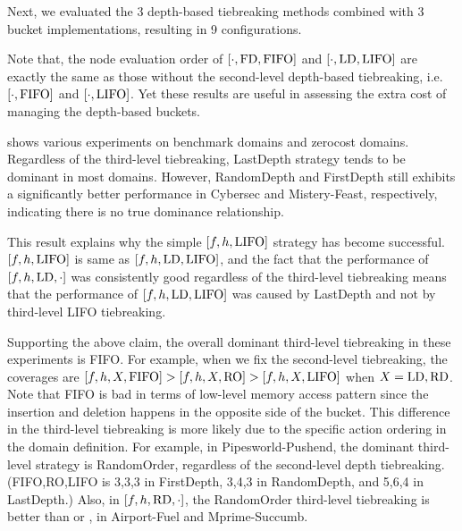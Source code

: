 Next, we evaluated the 3 depth-based tiebreaking methods combined with 3
bucket implementations, resulting in 9 configurations.

Note that, the node evaluation order of $[\cdot,\mbox{FD},\mbox{FIFO}]$ and $[\cdot,\mbox{LD},\mbox{LIFO}]$
are exactly the same as those without the second-level
depth-based tiebreaking, i.e.\ $[\cdot,\mbox{FIFO}]$ and $[\cdot,\mbox{LIFO}]$.
Yet these results are useful in assessing the extra cost of managing the
depth-based buckets.

 shows various experiments on benchmark domains and
zerocost domains. Regardless of the third-level tiebreaking, LastDepth
strategy tends to be dominant in most domains. However, RandomDepth and
FirstDepth still exhibits a significantly better performance in Cybersec
and Mistery-Feast, respectively, indicating there is no true dominance relationship.

This result explains why the simple $[f,h,\mbox{LIFO}]$ strategy has become
successful. $[f,h,\mbox{LIFO}]$ is same as $[f,h,\mbox{LD},\mbox{LIFO}]$, and the fact
that the performance of $[f,h,\mbox{LD},\cdot]$ was consistently good
regardless of the third-level tiebreaking means that the performance of
$[f,h,\mbox{LD},\mbox{LIFO}]$ was caused by LastDepth and not by third-level LIFO tiebreaking.

Supporting the above claim, the overall dominant third-level tiebreaking
in these experiments is FIFO.  For example, when we fix the second-level
tiebreaking, the coverages are $[f,h,X,\mbox{FIFO}]>[f,h,X,\mbox{RO}]>[f,h,X,\mbox{LIFO}]$
when $X=\mbox{LD},\mbox{RD}$.  Note that FIFO is bad in terms of low-level memory
access pattern since the insertion and deletion happens in the opposite
side of the bucket.  This difference in the third-level tiebreaking is
more likely due to the specific action ordering in the domain
definition.  For example, in Pipesworld-Pushend, the dominant
third-level strategy is RandomOrder, regardless of the second-level
depth tiebreaking.  (FIFO,RO,LIFO is 3,3,3 in FirstDepth, 3,4,3 in
RandomDepth, and 5,6,4 in LastDepth.) Also, in $[f,h,\mbox{RD},\cdot]$, the
RandomOrder third-level tiebreaking is better than \lifo or \fifo, in
Airport-Fuel and Mprime-Succumb.

% 


